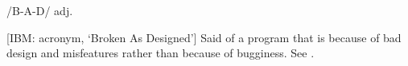  /B-A-D/ adj.

[IBM: acronym, `Broken As Designed'] Said of a program that is 
because of bad design and misfeatures rather than because of bugginess. See
.

